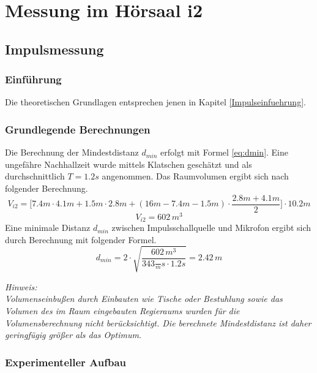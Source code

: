 \documentclass[11pt]{report}
\begin{document}
\section{Messung im H\"orsaal i2}
\subsection{Impulsmessung}
\subsubsection{Einf\"uhrung}
Die theoretischen Grundlagen entsprechen jenen in Kapitel \ref{Impulseinfuehrung}.
\subsubsection{Grundlegende Berechnungen}
Die Berechnung der Mindestdistanz $d_{min}$ erfolgt mit Formel \ref{eq:dmin}. Eine ungef\"ahre Nachhallzeit wurde mittels Klatschen gesch\"atzt und als durchschnittlich $T=1.2s$ angenommen. Das Raumvolumen ergibt sich nach folgender Berechnung.
\begin{equation}
V_{i2}=\Big[7.4m\cdot4.1m+1.5m\cdot2.8m+(16m-7.4m-1.5m)\cdot\frac{2.8m+4.1m}{2}\Big]\cdot10.2m
\end{equation}
\begin{equation}
V_{i2}= 602\,m^{3}
\end{equation}
Eine minimale Distanz $d_{min}$ zwischen Impulsschallquelle und Mikrofon ergibt sich durch Berechnung mit folgender Formel.
\begin{equation}
d_{min}=2\cdot\sqrt{\frac{602\,m^{3}}{343\frac\,{m}{s}\cdot 1.2s}}=2.42\,m
\end{equation}
\begin{leftbar}
\textit{ Hinweis:\\
Volumenseinbu\ss en durch Einbauten wie Tische oder Bestuhlung sowie das Volumen des im Raum eingebauten Regieraums wurden f\"ur die Volumensberechnung nicht ber\"ucksichtigt. Die berechnete Mindestdistanz ist daher geringf\"ugig gr\"o\ss er als das Optimum.}
\end{leftbar}
\subsubsection{Experimenteller Aufbau}
\end{document}
